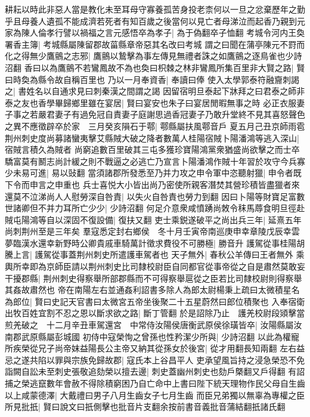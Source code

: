 耕耘以時此非惡人當是教化未至耳母守寡養孤苦身投老柰何以一旦之忿棄歷年之勤乎且母養人遺孤不能成濟若死者有知百歲之後當何以見亡者母涕泣而起香乃親到元家為陳人倫孝行譬以禍福之言元感悟卒為孝子|{
	為于偽翻卒子恤翻}
考城令河内王奐署香主簿|{
	考城縣屬陳留郡故菑縣章帝惡其名改曰考城}
謂之曰聞在蒲亭陳元不罸而化之得無少鷹鸇之志邪|{
	鷹鸇以鷙擊為事左傳見無禮者誅之如鷹鸇之逐鳥雀也少詩沼翻}
香曰以為鷹鸇不若鸞鳳故不為也奐曰枳棘之林非鸞鳳所集百里非大賢之路|{
	賢曰時奐為縣令故自稱百里也}
乃以一月奉資香|{
	奉讀曰俸}
使入太學郭泰符融齎刺謁之|{
	書姓名以自通求見曰刺秦漢之間謂之謁}
因留宿明旦泰起下牀拜之曰君泰之師非泰之友也香學畢歸鄉里雖在宴居|{
	賢曰宴安也朱子曰宴居閒暇無事之時}
必正衣服妻子事之若嚴君妻子有過免冠自責妻子庭謝思過香冠妻子乃敢升堂終不見其喜怒聲色之異不應徵辟卒於家　三月癸亥隕石于鄠|{
	鄠縣屬扶風鄠音戶}
夏五月己丑京師雨雹　荆州刺史度尚募諸蠻夷擊艾縣賊大破之降者數萬人桂陽宿賊卜陽潘鴻等逃入深山|{
	宿賊言積久為賊者}
尚窮追數百里破其三屯多獲珍寶陽鴻黨衆猶盛尚欲擊之而士卒驕富莫有鬭志尚計緩之則不戰逼之必逃亡乃宣言卜陽潘鴻作賊十年習於攻守今兵寡少未易可進|{
	易以䜴翻}
當須諸郡所發悉至乃并力攻之申令軍中恣聽射獵|{
	申令者既下令而申言之申重也}
兵士喜悦大小皆出尚乃密使所親客潛焚其營珍積皆盡獵者來還莫不泣涕尚人人慰勞深自咎責|{
	以失火自咎責也勞力到翻}
因曰卜陽等財寶足富數世諸卿但不并力耳所亡少少|{
	少詩沼翻}
何足介意衆咸憤踴尚敇令秣馬蓐食明旦徑赴賊屯陽鴻等自以深固不復設備|{
	復扶又翻}
吏士乘鋭遂破平之尚出兵三年|{
	延熹五年尚刺荆州至是三年矣}
羣寇悉定封右鄉侯　冬十月壬寅帝南巡庚申幸章陵戊辰幸雲夢臨漢水還幸新野時公卿貴戚車騎萬計徵求費役不可勝極|{
	勝音升}
護駕從事桂陽胡騰上言|{
	護駕從事蓋荆州刺史所遣護車駕者也}
天子無外|{
	春秋公羊傳曰王者無外}
乘輿所幸即為京師臣請以荆州刺史比司隸校尉臣自同都官從事帝從之自是肅然莫敢妄干擾郡縣|{
	荆州刺史得察舉所部郡縣而不可得察舉扈從之臣若比司隸校尉則得察舉其姦故肅然也}
帝在南陽左右並通姦利詔書多除人為郎太尉楊秉上疏曰太微積星名為郎位|{
	賢曰史記天官書曰太微宮五帝坐後聚二十五星蔚然曰郎位積聚也}
入奉宿衛出牧百姓宜割不忍之恩以斷求欲之路|{
	斷丁管翻}
於是詔除乃止　護羌校尉段熲擊當煎羌破之　十二月辛丑車駕還宮　中常侍汝陽侯唐衡武原侯徐璜皆卒|{
	汝陽縣屬汝南郡武原縣屬彭城國}
初侍中寇榮恂之曾孫也性矜潔少所與|{
	少詩沼翻}
以此為權寵所疾榮從兄子尚帝妺益陽長公主帝又納其從孫女於後宮|{
	從才用翻長知兩翻}
左右益忌之遂共陷以罪與宗族免歸故郡|{
	寇氏本上谷昌平人}
吏承望風旨持之浸急榮恐不免詣闕自訟未至刺史張敬追劾榮以擅去邊|{
	刺史蓋幽州刺史也劾戶槩翻又戶得翻}
有詔捕之榮逃竄數年會赦不得除積窮困乃自亡命中上書曰陛下統天理物作民父母自生齒以上咸蒙德澤|{
	大戴禮曰男子八月生齒女子七月生齒}
而臣兄弟獨以無辜為專權之臣所見批扺|{
	賢曰說文曰扺側擊也批音片支翻余按前書音義批音蒲結翻扺諸氏翻}
